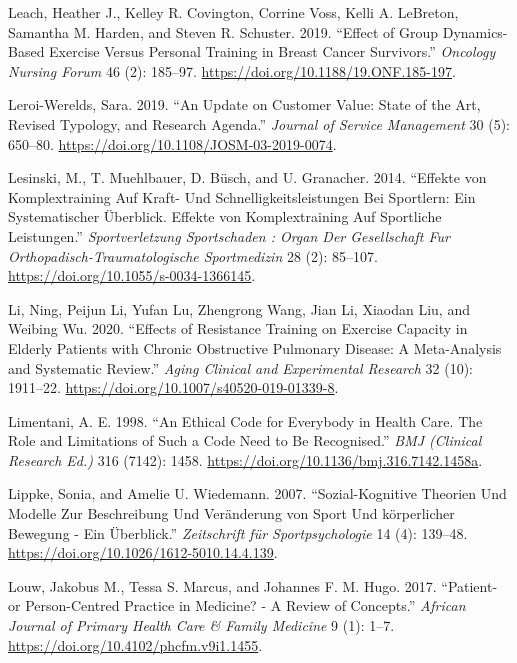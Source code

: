 \documentclass[
  letterpaper,
  DIV=11,
  numbers=noendperiod]{scrreprt}
\newlength{\cslhangindent}
\newenvironment{CSLReferences}[2] %
 {\begin{list}{}{%
  \setlength{\itemindent}{0pt}
  \setlength{\leftmargin}{0pt}
  \setlength{\parsep}{0pt}
  \ifodd #1
   \setlength{\leftmargin}{\cslhangindent}
   \setlength{\itemindent}{-1\cslhangindent}
  \fi
  \setlength{\itemsep}{#2\baselineskip}}}
 {\end{list}}
\begin{document}
\begin{CSLReferences}{1}{0}
Leach, Heather J., Kelley R. Covington, Corrine Voss, Kelli A. LeBreton,
Samantha M. Harden, and Steven R. Schuster. 2019. {``Effect of {Group
Dynamics-Based Exercise Versus Personal Training} in {Breast Cancer
Survivors}.''} \emph{Oncology Nursing Forum} 46 (2): 185--97.
\url{https://doi.org/10.1188/19.ONF.185-197}.

Leroi-Werelds, Sara. 2019. {``An Update on Customer Value: State of the
Art, Revised Typology, and Research Agenda.''} \emph{Journal of Service
Management} 30 (5): 650--80.
\url{https://doi.org/10.1108/JOSM-03-2019-0074}.

Lesinski, M., T. Muehlbauer, D. Büsch, and U. Granacher. 2014.
{``Effekte von {Komplextraining} Auf {Kraft-} Und
{Schnelligkeitsleistungen} Bei {Sportlern}: {Ein} Systematischer
{{Ü}berblick}. {Effekte} von {Komplextraining} Auf Sportliche
{Leistungen}.''} \emph{Sportverletzung Sportschaden : Organ Der
Gesellschaft Fur Orthopadisch-Traumatologische Sportmedizin} 28 (2):
85--107. \url{https://doi.org/10.1055/s-0034-1366145}.

Li, Ning, Peijun Li, Yufan Lu, Zhengrong Wang, Jian Li, Xiaodan Liu, and
Weibing Wu. 2020. {``Effects of Resistance Training on Exercise Capacity
in Elderly Patients with Chronic Obstructive Pulmonary Disease: A
Meta-Analysis and Systematic Review.''} \emph{Aging Clinical and
Experimental Research} 32 (10): 1911--22.
\url{https://doi.org/10.1007/s40520-019-01339-8}.

Limentani, A. E. 1998. {``An Ethical Code for Everybody in Health Care.
{The} Role and Limitations of Such a Code Need to Be Recognised.''}
\emph{BMJ (Clinical Research Ed.)} 316 (7142): 1458.
\url{https://doi.org/10.1136/bmj.316.7142.1458a}.

Lippke, Sonia, and Amelie U. Wiedemann. 2007. {``Sozial-Kognitive
{Theorien} Und {Modelle} Zur {Beschreibung} Und {Ver{ä}nderung} von
{Sport} Und k{ö}rperlicher {Bewegung} - Ein {{Ü}berblick}.''}
\emph{Zeitschrift f{ü}r Sportpsychologie} 14 (4): 139--48.
\url{https://doi.org/10.1026/1612-5010.14.4.139}.

Louw, Jakobus M., Tessa S. Marcus, and Johannes F. M. Hugo. 2017.
{``Patient- or Person-Centred Practice in Medicine? - {A} Review of
Concepts.''} \emph{African Journal of Primary Health Care \& Family
Medicine} 9 (1): 1--7. \url{https://doi.org/10.4102/phcfm.v9i1.1455}.


\end{CSLReferences}
\end{document}
